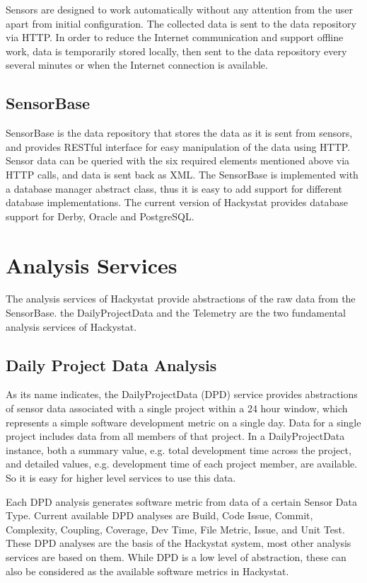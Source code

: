 Sensors are designed to work automatically without any attention from the user apart from initial configuration. The collected data is sent to the data repository via HTTP. In order to reduce the Internet communication and support offline work, data is temporarily stored locally, then sent to the data repository every several minutes or when the Internet connection is available.

\subsection{SensorBase}
SensorBase is the data repository that stores the data as it is sent from sensors, and provides RESTful interface for easy manipulation of the data using HTTP. Sensor data can be queried with the six required elements mentioned above via HTTP calls, and data is sent back as XML. The SensorBase is implemented with a database manager abstract class, thus it is easy to add support for different database implementations. The current version of Hackystat provides database support for Derby, Oracle and PostgreSQL.

\section{Analysis Services}
The analysis services of Hackystat provide abstractions of the raw data from the SensorBase. the DailyProjectData and the Telemetry are the two fundamental analysis services of Hackystat.

\subsection{Daily Project Data Analysis}
As its name indicates, the DailyProjectData (DPD) service provides abstractions of sensor data associated with a single project within a 24 hour window, which represents a simple software development metric on a single day. Data for a single project includes data from all members of that project. In a DailyProjectData instance, both a summary value, e.g. total development time across the project, and detailed values, e.g. development time of each project member, are available. So it is easy for higher level services to use this data.

Each DPD analysis generates software metric from data of a certain Sensor Data Type. Current available DPD analyses are Build, Code Issue, Commit, Complexity, Coupling, Coverage, Dev Time, File Metric, Issue, and Unit Test. These DPD analyses are the basis of the Hackystat system, most other analysis services are based on them. While DPD is a low level of abstraction, these can also be considered as the available software metrics in Hackystat.

